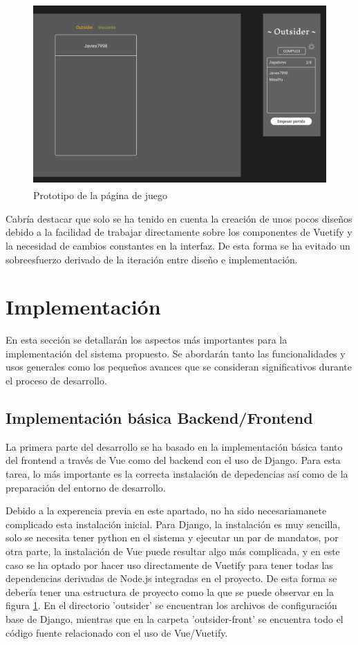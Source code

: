 \begin{figure}[h]
	\centering
	\includegraphics[height=7cm]{res_designJuego.png}
	\caption{Prototipo de la página de juego}
	\label{fig:res_designJuego}
\end{figure}

Cabría destacar que solo se ha tenido en cuenta la creación de unos pocos diseños debido a la facilidad de trabajar directamente
sobre los componentes de Vuetify y la necesidad de cambios constantes en la interfaz. De esta forma se ha evitado un 
sobreesfuerzo derivado de la iteración entre diseño e implementación.

\section{Implementación}

En esta sección se detallarán los aspectos más importantes para la implementación del sistema propuesto. 
Se abordarán tanto las funcionalidades y usos generales como los pequeños avances que se consideran significativos 
durante el proceso de desarrollo.

\subsection{Implementación básica Backend/Frontend}

La primera parte del desarrollo se ha basado en la implementación básica tanto del frontend a través de Vue como del 
backend con el uso de Django. Para esta tarea, lo más importante es la correcta instalación de depedencias así como de
la preparación del entorno de desarrollo.

Debido a la experencia previa en este apartado, no ha sido necesariamanete complicado esta instalación inicial. Para Django,
la instalación es muy sencilla, solo se necesita tener python en el sistema y ejecutar un par de mandatos, por otra parte,
la instalación de Vue puede resultar algo más complicada, y en este caso se ha optado por hacer uso directamente de Vuetify para
tener todas las dependencias derivadas de Node.js integradas en el proyecto. De esta forma se debería tener una estructura de proyecto
como la que se puede observar en la figura \ref{fig:res_designJuego}. En el directorio 'outsider' se encuentran los archivos 
de configuración base de Django, mientras que en la carpeta 'outsider-front' se encuentra todo el código fuente relacionado 
con el uso de Vue/Vuetify. 


